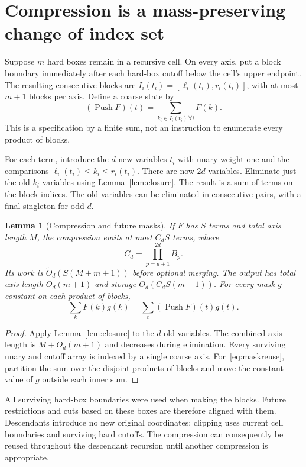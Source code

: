 \documentclass[12pt,a4paper]{article}
\newtheorem{lemma}[theorem]{Lemma}
\theoremstyle{definition}
\newcommand{\wtO}{\widetilde O}
\newcommand{\Push}{\operatorname{Push}}
\begin{document}
\section{Compression is a mass-preserving change of index set}
\label{sec:compression}

Suppose $m$ hard boxes remain in a recursive cell. On every axis, put a
block boundary immediately after each hard-box cutoff below the cell's
upper endpoint. The resulting consecutive blocks are
$I_i(t_i)=[\ell_i(t_i),r_i(t_i)]$, with at most $m+1$ blocks per axis.
Define a coarse state by
\begin{equation}
 (\Push F)(t)=\sum_{k_i\in I_i(t_i)\,\forall i}F(k).
 \label{eq:push}
\end{equation}
This is a specification by a finite sum, not an instruction to enumerate
every product of blocks.

For each term, introduce the $d$ new variables $t_i$ with unary weight
one and the comparisons
$\ell_i(t_i)\le k_i\le r_i(t_i)$. There are now $2d$ variables.
Eliminate just the old $k_i$ variables using Lemma~\ref{lem:closure}.
The result is a sum of terms on the block indices. The old variables
can be eliminated in consecutive pairs, with a final singleton for
odd $d$.

\begin{lemma}[Compression and future masks]\label{lem:compression}
If $F$ has $S$ terms and total axis length $M$, the compression emits at
most $C_dS$ terms, where
\[
                       C_d=\prod_{p=d+1}^{2d}B_p.
\]
Its work is $\wtO_d(S(M+m+1))$ before optional merging. The output has
total axis length $O_d(m+1)$ and storage $O_d(C_dS(m+1))$.
For every mask $g$ constant on each product of blocks,
\begin{equation}
             \sum_k F(k)g(k)=\sum_t(\Push F)(t)g(t).
 \label{eq:maskreuse}
\end{equation}
\end{lemma}
\begin{proof}
Apply Lemma~\ref{lem:closure} to the $d$ old variables. The combined
axis length is $M+O_d(m+1)$ and decreases during elimination. Every
surviving unary and cutoff array is indexed by a single coarse axis.
For~\eqref{eq:maskreuse}, partition the sum over the disjoint products
of blocks and move the constant value of $g$ outside each inner sum.
\end{proof}

All surviving hard-box boundaries were used when making the blocks.
Future restrictions and cuts based on these boxes are therefore aligned
with them. Descendants introduce no new original coordinates: clipping
uses current cell boundaries and surviving hard cutoffs. The compression
can consequently be reused throughout the descendant recursion until
another compression is appropriate.
\end{document}
